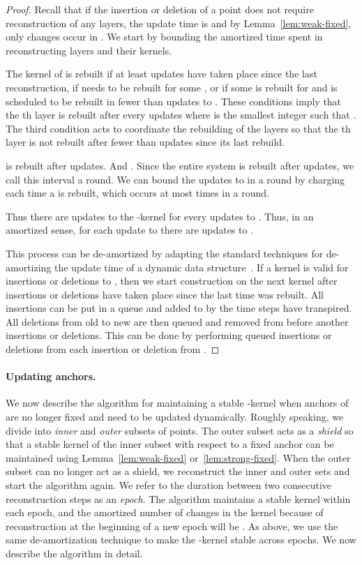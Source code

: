 \documentclass[11pt]{myclass}
\begin{document}
\begin{proof}
Recall that if the insertion or deletion of a point does not require reconstruction of any layers, the update time is  and by Lemma~\ref{lem:weak-fixed}, only  changes occur in . 
We start by bounding the amortized time spent in reconstructing layers and their kernels.  

The kernel  of  is rebuilt if at least  updates have taken place since the last reconstruction, if  needs to be rebuilt for some , or 
if some  is rebuilt for  and  is scheduled to be rebuilt in fewer than  updates to .  These conditions imply that the th layer is rebuilt after every  updates where  is the smallest integer such that .  
The third condition acts to coordinate the rebuilding of the layers so that the th layer is not rebuilt after fewer than  updates since its last rebuild.  

 is rebuilt after  updates.  And .  Since the entire system is rebuilt after  updates, we call this interval a round.  We can bound the updates to  in a round by charging  each time a  is rebuilt, which occurs at most  times in a round.

Thus there are  updates to the -kernel  for every  updates to .  Thus, in an amortized sense, for each update to  there are  updates to .  

This process can be 
de-amortized by adapting the standard techniques for de-amortizing the 
update time of a dynamic data structure~\cite{Ove83}. 
If a kernel  is valid for  insertions or deletions to , then we start construction on the next kernel  after  insertions or deletions have taken place since the last time  was rebuilt.  All insertions can be put in a queue and added to  by the time  steps have transpired.  All deletions from old  to new  are then queued and removed from  before another  insertions or deletions.  This can be done by performing  queued insertions or deletions from  each insertion or deletion from .  
\end{proof}



\paragraph{Updating anchors.}

We now describe the algorithm for maintaining a stable -kernel when
anchors of  are no longer fixed and need to be updated dynamically. 
Roughly speaking,
we divide  into \emph{inner} and \emph{outer} subsets of points. 
The outer subset acts as a \emph{shield} so that a stable kernel of the inner
subset with respect to a fixed anchor can be maintained using 
Lemma~\ref{lem:weak-fixed} or~\ref{lem:strong-fixed}. When the 
outer subset can no longer act as a shield, we reconstruct the inner
and outer sets and start the algorithm again. We refer to the duration 
between two consecutive reconstruction steps as an \emph{epoch}. 
The algorithm maintains a stable kernel within each epoch, and 
the amortized number of changes in the kernel because of 
reconstruction at the beginning of a new epoch will be . As above, we 
use the same de-amortization technique to make the -kernel stable
across epochs. We now describe the algorithm in detail.
\end{document}
